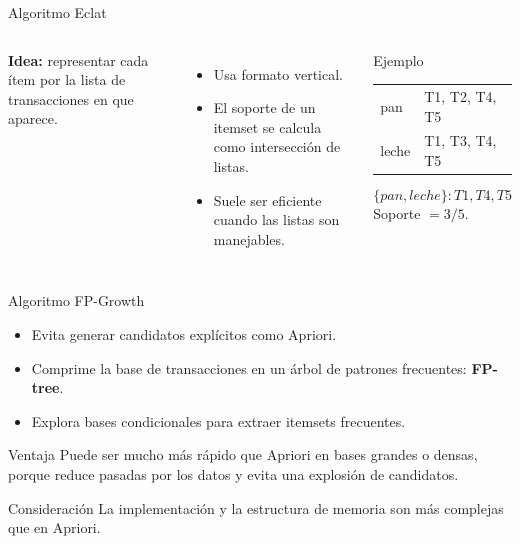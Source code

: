 \documentclass[10pt,aspectratio=169]{beamer}
\begin{document}
\begin{frame}{Algoritmo Eclat}
\begin{columns}[T]
\textbf{Idea:} representar cada ítem por la lista de transacciones en que aparece.

\vspace{0.2cm}
\begin{itemize}
  \item Usa formato vertical.
  \item El soporte de un itemset se calcula como intersección de listas.
  \item Suele ser eficiente cuando las listas son manejables.
\end{itemize}

\begin{exampleblock}{Ejemplo}
\begin{tabular}{ll}
pan & T1, T2, T4, T5 \\
leche & T1, T3, T4, T5 \\
\end{tabular}

\vspace{0.2cm}
\[
\{pan, leche\}: T1,T4,T5
\]
Soporte $=3/5$.
\end{exampleblock}
\end{columns}
\end{frame}

\begin{frame}{Algoritmo FP-Growth}
\begin{itemize}
  \item Evita generar candidatos explícitos como Apriori.
  \item Comprime la base de transacciones en un árbol de patrones frecuentes: \textbf{FP-tree}.
  \item Explora bases condicionales para extraer itemsets frecuentes.
\end{itemize}

\begin{block}{Ventaja}
Puede ser mucho más rápido que Apriori en bases grandes o densas, porque reduce pasadas por los datos y evita una explosión de candidatos.
\end{block}

\begin{alertblock}{Consideración}
La implementación y la estructura de memoria son más complejas que en Apriori.
\end{alertblock}
\end{frame}
\end{document}
